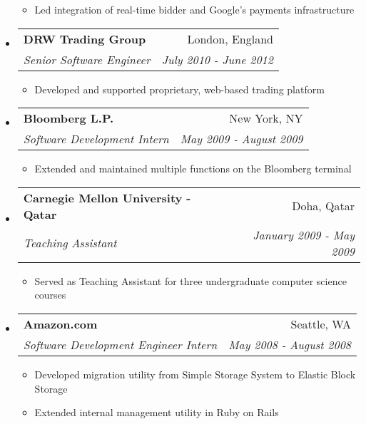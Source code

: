 \documentclass[10pt]{article}
\makeatletter
\newcommand{\resitem}[1]{\item #1 \vspace{-2pt}}
\newcommand{\ressubheading}[4]{
\begin{tabular*}{6.5in}{l@{\extracolsep{\fill}}r}
    \textbf{#1} & #2 \\
    \textit{#3} & \textit{#4} \\
\end{tabular*}\vspace{-6pt}}
\makeatother
\begin{document}
\begin{itemize}
\begin{itemize}
        \resitem{Led integration of real-time bidder and Google's payments infrastructure}
    \end{itemize}
\item
    \ressubheading{DRW Trading Group}{London, England}{Senior Software Engineer}{July 2010 - June 2012}
    \begin{itemize}
        \resitem{Developed and supported proprietary, web-based trading platform}
    \end{itemize}
\item
    \ressubheading{Bloomberg L.P.}{New York, NY}{Software Development Intern}{May 2009 - August 2009}
    \begin{itemize}
        \resitem{Extended and maintained multiple functions on the Bloomberg terminal}
    \end{itemize}
\item
    \ressubheading{Carnegie Mellon University - Qatar}{Doha, Qatar}{Teaching Assistant}{January 2009 - May 2009}
    \begin{itemize}
        \resitem{Served as Teaching Assistant for three undergraduate computer science courses}
    \end{itemize}
\item
    \ressubheading{Amazon.com}{Seattle, WA}{Software Development Engineer Intern}{May 2008 - August 2008}
    \begin{itemize}
        \resitem{Developed migration utility from Simple Storage System to Elastic Block Storage}
        \resitem{Extended internal management utility in Ruby on Rails}
    \end{itemize}
\end{itemize}
\end{document}
